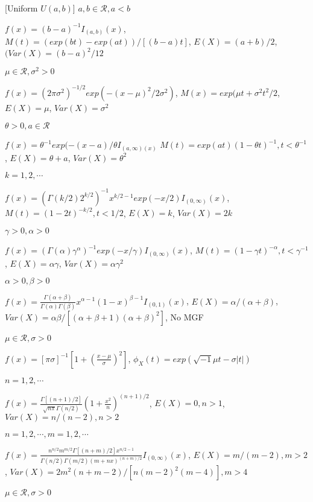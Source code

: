 [Uniform $U(a, b)$] $a, b \in \mathcal{R}, a < b$

$f(x) = (b-a)^{-1}I_{(a, b)}(x)$,
$M(t)=(exp(bt)-exp(at))/[(b-a)t]$,
$E(X)=(a+b)/2$,
$(Var(X)=(b-a)^2/12$

 $\mu\in\mathcal{R}, \sigma^2 > 0$

$f(x)=(2\pi\sigma^2)^{-1/2}exp(-(x-\mu)^2/2\sigma^2)$,
$M(x)=exp(\mu t + \sigma^2 t^2/2$,
$E(X)=\mu$,
$Var(X)=\sigma^2$

 $\theta > 0, a\in\mathcal{R}$

$f(x)=\theta^{-1}exp(-(x-a)/\theta I_{(a, \infty)(x)}$
$M(t)=exp(at)(1-\theta t)^{-1}, t<\theta^{-1}$,
$E(X)=\theta+a$,
$Var(X)=\theta^2$

 $k=1, 2, \cdots$

$f(x)=(\Gamma(k/2)2^{k/2})^{-1}x^{k/2-1}exp(-x/2)I_{(0, \infty)}(x)$,
$M(t)=(1-2t)^{-k/2}, t<1/2$,
$E(X)=k$,
$Var(X)=2k$

 $\gamma >0, \alpha >0$

$f(x)=(\Gamma(\alpha)\gamma^{\alpha})^{-1}exp(-x/\gamma)I_{(0, \infty)}(x)$,
$M(t)=(1-\gamma t)^{-\alpha}, t < \gamma^{-1}$,
$E(X)=\alpha\gamma$,
$Var(X)=\alpha\gamma^2$

 $\alpha > 0, \beta > 0$

$f(x) = \frac{\Gamma(\alpha+\beta)}{\Gamma(\alpha)\Gamma(\beta)}x^{\alpha-1}(1-x)^{\beta-1}I_{(0, 1)}(x)$,
$E(X)=\alpha/(\alpha+\beta)$,
$Var(X)=\alpha\beta/[(\alpha+\beta+1)(\alpha+\beta)^2]$,
No MGF

 $\mu\in\mathcal{R}, \sigma > 0$

$f(x)=[\pi\sigma]^{-1}\left[1+\left(\frac{x-\mu}{\sigma}\right)^2\right]$,
$\phi_X(t)=exp\left(\sqrt{-1}\mu t-\sigma|t|\right)$

\pline
[t $t_n$] $n=1, 2, \cdots$

$f(x)=\frac{\Gamma[(n+1)/2]}{\sqrt{n\pi}\Gamma(n/2)}\left(1+\frac{x^2}{n}\right)^{(n+1)/2}$,
$E(X)=0, n>1$,
$Var(X)=n/(n-2), n>2$

\pline
[F $F_{n, m}$] $n=1, 2, \cdots, m=1, 2, \cdots$

$f(x)=\frac{n^{n/2}m^{m/2}\Gamma[(n+m)/2]x^{n/2-1}}{\Gamma(n/2)\Gamma(m/2)(m+nx)^{(n+m)/2}}I_{(0, \infty)}(x)$,
$E(X)=m/(m-2), m>2$,
$Var(X)=2m^2(n+m-2)/[n(m-2)^2(m-4)], m>4$

 $\mu\in\mathcal{R}, \sigma>0$

